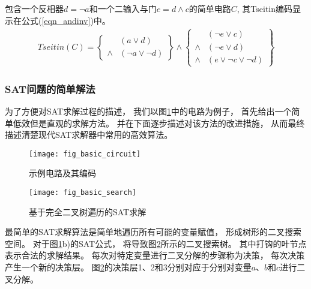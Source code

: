 包含一个反相器$d=\neg a$和一个二输入与门$e=d\wedge c$的简单电路$C$,
其Tseitin编码显示在公式(\ref{eqn_andinv})中。
\begin{multline}\label{eqn_andinv}
Tseitin(C)=
\left\{
\begin{array}{cc}
& (a\vee d) \\
\wedge & (\neg a\vee \neg d)
\end{array}
\right\}\wedge\left\{
\begin{array}{cc}
& (\neg e\vee c) \\
\wedge & (\neg e\vee d) \\
\wedge & (e\vee \neg c\vee\neg d)
\end{array}
\right\}
\end{multline}



\subsubsection{SAT问题的简单解法}
为了方便对SAT求解过程的描述，
我们以图\ref{basic_circuit}中的电路为例子，
首先给出一个简单低效但是直观的求解方法。
并在下面逐步描述对该方法的改进措施，
从而最终描述清楚现代SAT求解器中常用的高效算法。

\begin{figure}[t] %
  \centering
  \texttt{[image: fig\_basic\_circuit]}
  \caption{示例电路及其编码}
  \label{basic_circuit}
\end{figure}
\begin{figure}[b] %
  \centering
  \texttt{[image: fig\_basic\_search]}
  \caption{基于完全二叉树遍历的SAT求解}
  \label{basic_search}
\end{figure}

最简单的SAT求解算法是简单地遍历所有可能的变量赋值，
形成树形的二叉搜索空间。
对于图\ref{basic_circuit}b)的SAT公式，
将导致图\ref{basic_search}所示的二叉搜索树。
其中打钩的叶节点表示合法的求解结果。
每次对特定变量进行二叉分解的步骤称为决策，
每次决策产生一个新的决策层。
图\ref{basic_search}的决策层1、2和3分别对应于分别对变量$a$、$b$和$c$进行二叉分解。



